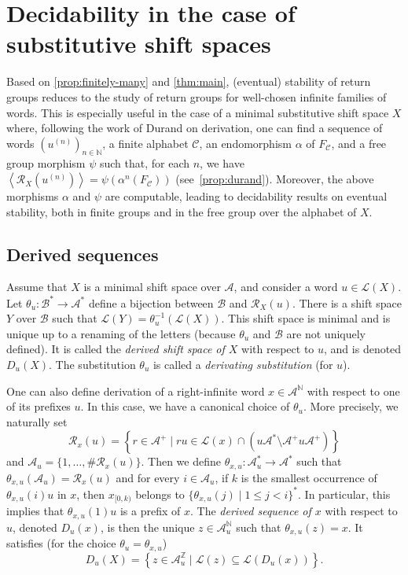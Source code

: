 \documentclass{amsart}
\newcommand*{\N}{\mathbb{N}}
\newcommand*{\nn}{\mathbb{N}}
\newcommand*{\ret}{\mathcal{R}}
\newcommand*{\lang}{\mathcal{L}}
\newcommand*{\cA}{\mathcal{A}}
\newcommand*{\cB}{\mathcal{B}}
\newcommand*{\cC}{\mathcal{C}}
\newcommand*{\from}{\colon}
\newcommand*{\card}{\#}
\newcommand*{\gen}[1]{\left\langle #1\right\rangle}
\theoremstyle{plain}
\theoremstyle{definition}
\theoremstyle{remark}
\begin{document}
\section{Decidability in the case of substitutive shift spaces}\label{S:decidability}

Based on \cref{prop:finitely-many} and \cref{thm:main}, (eventual) stability of return groups reduces to the study of return groups for well-chosen infinite families of words. This is especially useful in the case of a minimal substitutive shift space $X$ where, following the work of Durand on derivation, one can find a sequence of words $(u^{(n)})_{n \in \N}$, a finite alphabet $\cC$, an endomorphism $\alpha$ of $F_\cC$, and a free group morphism $\psi$ such that, for each $n$, we have $\gen{\ret_X(u^{(n)})} = \psi(\alpha^n(F_\cC))$ (see~\cref{prop:durand}). Moreover, the above morphisms $\alpha$ and $\psi$ are computable, leading to decidability results on eventual stability, both in finite groups and in the free group over the alphabet of $X$.

\subsection{Derived sequences}

Assume that $X$ is a minimal shift space over $\cA$, and consider a word $u \in \lang(X)$. 
Let $\theta_u\from \cB^* \to \cA^*$ define a bijection between $\cB$ and $\ret_X(u)$. There is a shift space $Y$ over $\cB$ such that $\lang(Y) = \theta_u^{-1}(\lang(X))$. This shift space is minimal and is unique up to a renaming of the letters (because $\theta_u$ and $\cB$ are not uniquely defined). It is called the {\em derived shift space of $X$} with respect to $u$, and is denoted $D_u(X)$. The substitution $\theta_u$ is called a {\em derivating substitution} (for $u$).

One can also define derivation of a right-infinite word $x\in\cA^\nn$ with respect to one of its prefixes $u$. In this case, we have a canonical choice of $\theta_u$. More precisely, we naturally set
\begin{equation*}
    \ret_x(u) = \left\{ r\in \cA^+ \mid ru\in \lang(x)\cap (u\cA^*\setminus \cA^+u\cA^+)\right\}
\end{equation*}
and $\cA_u = \{1,\dots,\card\ret_x(u)\}$. Then we define $\theta_{x,u}\from \cA_u^* \to \cA^*$ such that $\theta_{x,u}(\cA_u) = \ret_x(u)$ and for every $i \in \cA_u$, if $k$ is the smallest occurrence of $\theta_{x,u}(i)u$ in $x$, then $x_{[0,k)}$ belongs to $\{\theta_{x,u}(j) \mid 1 \leq j < i\}^*$. In particular, this implies that $\theta_{x,u}(1)u$ is a prefix of $x$.
The {\em derived sequence of $x$} with respect to $u$, denoted $D_u(x)$, is then the unique $z \in \cA_u^\N$ such that $\theta_{x,u}(z) = x$. It satisfies (for the choice $\theta_u = \theta_{x,u}$)
\begin{equation*}
    D_u(X) = \left\{z \in \cA_u^\mathbb{Z} \mid \lang(z) \subseteq \lang(D_u(x))\right\}.  
\end{equation*}
\end{document}
